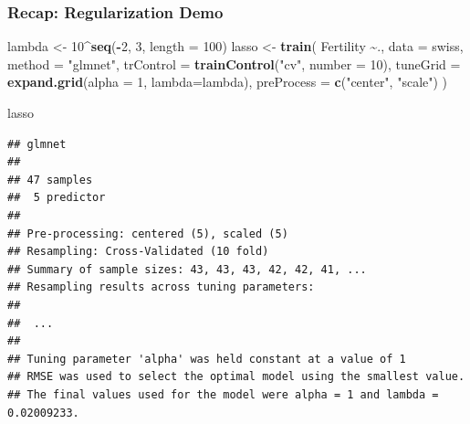 \documentclass[
  shownotes,
  xcolor={svgnames},
  hyperref={colorlinks,citecolor=DarkBlue,linkcolor=DarkRed,urlcolor=DarkBlue}
  , aspectratio=169]{beamer}
\newenvironment{Shaded}{\begin{snugshade}}{\end{snugshade}}
\newcommand{\DataTypeTok}[1]{\textcolor[rgb]{0.13,0.29,0.53}{#1}}
\newcommand{\DecValTok}[1]{\textcolor[rgb]{0.00,0.00,0.81}{#1}}
\newcommand{\KeywordTok}[1]{\textcolor[rgb]{0.13,0.29,0.53}{\textbf{#1}}}
\newcommand{\NormalTok}[1]{#1}
\newcommand{\OperatorTok}[1]{\textcolor[rgb]{0.81,0.36,0.00}{\textbf{#1}}}
\newcommand{\StringTok}[1]{\textcolor[rgb]{0.31,0.60,0.02}{#1}}
\begin{document}
\begin{frame}[fragile]
\frametitle{Recap: Regularization Demo}

\begin{scriptsize}
\begin{Shaded}
\begin{Highlighting}[]
\NormalTok{lambda \textless{}{-}}\StringTok{ }\DecValTok{10}\OperatorTok{\^{}}\KeywordTok{seq}\NormalTok{(}\OperatorTok{{-}}\DecValTok{2}\NormalTok{, }\DecValTok{3}\NormalTok{, }\DataTypeTok{length =} \DecValTok{100}\NormalTok{)}
\NormalTok{lasso \textless{}{-}}\StringTok{ }\KeywordTok{train}\NormalTok{(}
\NormalTok{  Fertility }\OperatorTok{\textasciitilde{}}\NormalTok{., }\DataTypeTok{data =}\NormalTok{ swiss, }\DataTypeTok{method =} \StringTok{"glmnet"}\NormalTok{,}
  \DataTypeTok{trControl =} \KeywordTok{trainControl}\NormalTok{(}\StringTok{"cv"}\NormalTok{, }\DataTypeTok{number =} \DecValTok{10}\NormalTok{),}
  \DataTypeTok{tuneGrid =} \KeywordTok{expand.grid}\NormalTok{(}\DataTypeTok{alpha =} \DecValTok{1}\NormalTok{, }\DataTypeTok{lambda=}\NormalTok{lambda), }\DataTypeTok{preProcess =} \KeywordTok{c}\NormalTok{(}\StringTok{"center"}\NormalTok{, }\StringTok{"scale"}\NormalTok{)}
\NormalTok{  )}

\NormalTok{lasso}
\end{Highlighting}
\end{Shaded}
\end{scriptsize}
\begin{tiny}


\begin{verbatim}
## glmnet 
## 
## 47 samples
##  5 predictor
## 
## Pre-processing: centered (5), scaled (5) 
## Resampling: Cross-Validated (10 fold) 
## Summary of sample sizes: 43, 43, 43, 42, 42, 41, ... 
## Resampling results across tuning parameters:
## 
##  ...
## 
## Tuning parameter 'alpha' was held constant at a value of 1
## RMSE was used to select the optimal model using the smallest value.
## The final values used for the model were alpha = 1 and lambda = 0.02009233.
\end{verbatim}
\end{tiny}
\end{frame}
\end{document}
